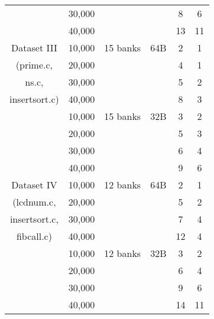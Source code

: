 \begin{table}
\begin{flushleft}
{\begin{tabular}{|c|c|c|c|c|c|}
            & 30,000 &          &     & 8 & 6 \\
            & 40,000 &          &     & 13 & 11 \\ \hline
 Dataset III & 10,000 & 15 banks & 64B & 2 & 1 \\
 (prime.c,   & 20,000 &          &     & 4 & 1 \\
  ns.c,      & 30,000 &          &     & 5 & 2 \\
  insertsort.c)& 40,000 &          &     & 8 & 3 \\ \hline
             &10,000 & 15 banks & 32B & 3 & 2 \\  
             & 20,000&          &     & 5 & 3 \\
             & 30,000&          &     & 6 & 4 \\
             & 40,000&          &     & 9 & 6 \\ \hline
 Dataset IV  & 10,000& 12 banks & 64B & 2 & 1 \\
 (lcdnum.c,  & 20,000 &         &     & 5 & 2 \\
  insertsort.c,& 30,000 &         &     & 7 & 4 \\
  fibcall.c) & 40,000 &         &     & 12 & 4 \\ \hline
             &10,000 & 12 banks & 32B & 3 & 2 \\
             & 20,000 &         &     & 6 & 4 \\
             & 30,000 &         &     & 9 & 6 \\
             & 40,000 &         &     & 14 & 11\\ \hline  
 \end{tabular}
 }
\end{flushleft}
\label{Data_results}
\end{table}


